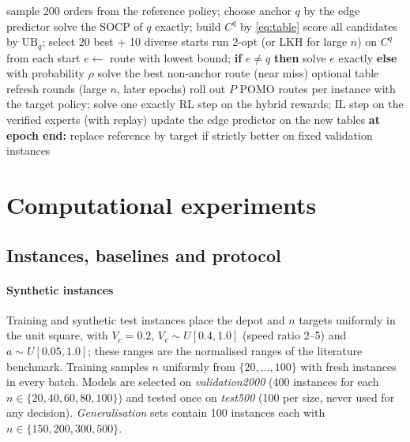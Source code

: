 \documentclass[preprint,review,12pt,authoryear]{elsarticle}
\newcommand{\UB}{\mathrm{UB}}
\begin{document}
\begin{algorithm}[t]
\caption{Self-improving training (one batch $\mathcal B$)}\label{alg:train}
\begin{algorithmic}[1]
  \State sample 200 orders from the reference policy; choose anchor $q$ by the edge predictor
  \State solve the SOCP of $q$ exactly; build $C^{q}$ by \eqref{eq:table} 
  \State score all candidates by $\UB_q$; select 20 best + 10 diverse starts
  \State run 2-opt (or LKH for large $n$) on $C^q$ from each start 
  \State $e\gets$ route with lowest bound; \textbf{if} $e\ne q$ \textbf{then} solve $e$ exactly 
  \State \textbf{else} with probability $\rho$ solve the best non-anchor route (near miss)
  \State optional table refresh rounds (large $n$, later epochs)
\EndFor
\State roll out $P$ POMO routes per instance with the target policy; solve one exactly 
\State RL step on the hybrid rewards; IL step on the verified experts (with replay)
\State update the edge predictor on the new tables
\State \textbf{at epoch end:} replace reference by target if strictly better on fixed validation instances
\end{algorithmic}
\end{algorithm}

\section{Computational experiments}\label{sec:exp}

\subsection{Instances, baselines and protocol}\label{sec:setup}
\paragraph{Synthetic instances}
Training and synthetic test instances place the depot and $n$ targets uniformly in the unit square, with
$V_c=0.2$, $V_v\sim U[0.4,1.0]$ (speed ratio 2--5) and $a\sim U[0.05,1.0]$; these ranges are the normalised
ranges of the literature benchmark. Training samples $n$ uniformly from $\{20,\dots,100\}$ with fresh
instances in every batch. Models are selected on \emph{validation2000} (400 instances for each
$n\in\{20,40,60,80,100\}$) and tested once on \emph{test500} (100 per size, never used for any decision).
\emph{Generalisation} sets contain 100 instances each with $n\in\{150,200,300,500\}$.
\end{document}
